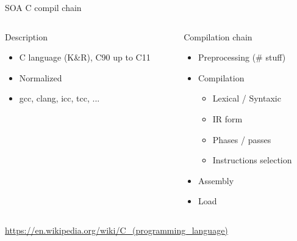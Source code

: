 %
\begin{Frame}{SOA C compil chain}
  \begin{columns}[t]
    \begin{column}{\BW} %
      \begin{block}{Description}
        \begin{itemize}
        \item C language (K\&R), C90 up to C11
        \item Normalized
        \item gcc, clang, icc, tcc, ...
        \end{itemize}
      \end{block}
    \end{column}

    \begin{column}{\BW} %
      \begin{block}{Compilation chain}
        \begin{itemize}
        \item Preprocessing (\# stuff)
        \item Compilation
          \begin{itemize}
          \item Lexical / Syntaxic
          \item IR form
          \item Phases / passes
          \item Instructions selection
          \end{itemize}
        \item Assembly
        \item Load
        \end{itemize}
      \end{block}
    \end{column}
  \end{columns}
  \url{https://en.wikipedia.org/wiki/C_(programming_language)}
\end{Frame}

